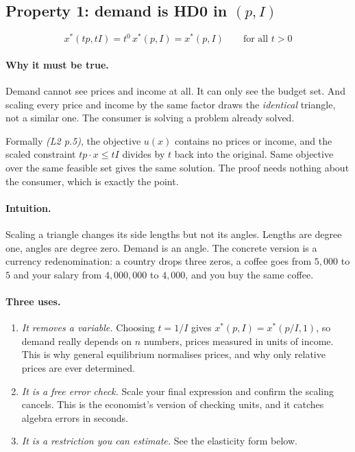 \documentclass[11pt]{article}
\theoremstyle{definition}
\newcommand{\xs}{x^*}
\newcommand{\src}[1]{\textit{\small (#1)}}
\begin{document}
\subsection{Property 1: demand is HD0 in $(p,I)$}

\[
\xs(tp,tI)=t^0\,\xs(p,I)=\xs(p,I)\qquad\text{for all } t>0
\]

\paragraph{Why it must be true.} Demand cannot see prices and income at all. It can only
see the budget set. And scaling every price and income by the same factor draws the
\emph{identical} triangle, not a similar one. The consumer is solving a problem already
solved.

Formally \src{L2 p.5}, the objective $u(x)$ contains no prices or income, and the scaled
constraint $tp\cdot x\le tI$ divides by $t$ back into the original. Same objective over the
same feasible set gives the same solution. The proof needs nothing about the consumer,
which is exactly the point.

\paragraph{Intuition.} Scaling a triangle changes its side lengths but not its angles.
Lengths are degree one, angles are degree zero. Demand is an angle. The concrete version is
a currency redenomination: a country drops three zeros, a coffee goes from $5{,}000$ to
$5$ and your salary from $4{,}000{,}000$ to $4{,}000$, and you buy the same coffee.

\paragraph{Three uses.}
\begin{enumerate}
\item \emph{It removes a variable.} Choosing $t=1/I$ gives $\xs(p,I)=\xs(p/I,1)$, so demand
really depends on $n$ numbers, prices measured in units of income. This is why general
equilibrium normalises prices, and why only relative prices are ever determined.
\item \emph{It is a free error check.} Scale your final expression and confirm the scaling
cancels. This is the economist's version of checking units, and it catches algebra errors
in seconds.
\item \emph{It is a restriction you can estimate.} See the elasticity form below.
\end{enumerate}
\end{document}
